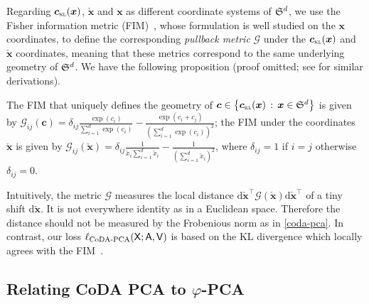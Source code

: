 \documentclass{article}
\begin{document}
Regarding $\clrlog(\bm{x})$, $\check{\bm{x}}$ and $\bm{x}$ as different coordinate systems of $\mathfrak{S}^d$,
we use the Fisher information metric (FIM)~\cite{aIG}, whose formulation is well studied on the $\bm{x}$ coordinates,
to define the corresponding \emph{pullback metric} $\mathcal{G}$ under the
$\clrlog(\bm{x})$ and $\check{\bm{x}}$ coordinates,
meaning that these metrics correspond to the same underlying geometry of $\mathfrak{S}^d$.
We have the following proposition (proof omitted; see \cite{smAI} for similar derivations).
\begin{proposition}
The FIM that uniquely defines the geometry of
$\bm{c}\in\left\{\clrlog(\bm{x})\,:\,\bm{x}\in\Se^d\right\}$ is given by
$\mathcal{G}_{ij}(\bm{c})=\delta_{ij} \frac{\exp(c_i)}{\sum_{i=1}^d\exp(c_i)} - \frac{\exp(c_i+c_j)}{\left(\sum_{i=1}^d\exp(c_i)\right)^2}$;
the FIM under the coordinates $\check{\bm{x}}$ is given by
$\mathcal{G}_{ij}(\check{\bm{x}})=\delta_{ij} \frac{1}{\check{x}_i\sum_{i=1}^d\check{x}_i} - \frac{1}{(\sum_{i=1}^d\check{x}_i)^2}$,
where $\delta_{ij}=1$ if $i=j$ otherwise $\delta_{ij}=0$.
\end{proposition}
Intuitively, the metric $\mathcal{G}$ measures the local distance
$\mathrm{d}\check{\bm{x}}^\top\mathcal{G}(\check{\bm{x}})\mathrm{d}\check{\bm{x}}^\top$
of a tiny shift $\mathrm{d}\check{\bm{x}}$. It is not everywhere identity as in a Euclidean space.
Therefore the distance should not be measured by the Frobenious norm as in \eqref{coda-pca}.
In contrast, our loss $\ell_{\mathrm{CoDA\text{-}PCA}}(\mathsf{X}; \mathsf{A}, \mathsf{V})$
is based on the KL divergence which locally agrees with the FIM~\cite{aIG}.

\subsection{Relating CoDA PCA to $\varphi$-PCA}
\end{document}

